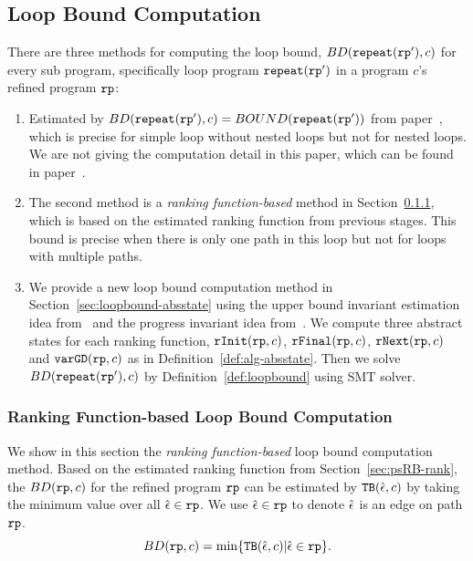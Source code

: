 
\subsection{Loop Bound Computation}
There are three methods for computing the loop bound, $BD(\mathtt{repeat}(\mathtt{rp}'), c)$ for every sub program, specifically loop program $\mathtt{repeat}(\mathtt{rp}')$ in a program $c$'s refined program $\mathtt{rp}$:
\begin{enumerate}
  \item Estimated by $BD(\mathtt{repeat}(\mathtt{rp}'), c) = BOUND(\mathtt{repeat}(\mathtt{rp}'))$ from paper~\cite{GulwaniJK09}, which is precise for simple loop without nested loops but not for nested loops. We are not giving the computation detail in this paper, which can be found in paper~\cite{GulwaniJK09}.
  \item 
  The second method is a \emph{ranking function-based}  method in Section~\ref{sec:loopbound-rankbased}, which is
  based on the estimated ranking function from previous stages.
  This bound is precise when there is only one path in this loop but not for loops with multiple paths.
  \item We provide a new loop bound computation method in Section~\ref{sec:loopbound-absstate} using the upper bound invariant estimation idea from~\cite{SinnZV17} and the progress invariant idea from~\cite{GulwaniJK09}.
  We compute three abstract states for each ranking function, $\mathtt{rInit}(\mathtt{rp}, c)$, $\mathtt{rFinal}(\mathtt{rp}, c)$, $\mathtt{rNext}(\mathtt{rp}, c)$ and $\mathtt{varGD}(\mathtt{rp}, c)$ as in Definition~\ref{def:alg-absstate}.
  Then we solve $BD(\mathtt{repeat}(\mathtt{rp}'), c)$ by Definition~\ref{def:loopbound} using SMT solver.
\end{enumerate}
%
\subsubsection{Ranking Function-based Loop Bound Computation}
\label{sec:loopbound-rankbased}
We show in this section the \emph{ranking function-based} loop bound computation method.
Based on the estimated ranking function from Section~\ref{sec:psRB-rank}, the $BD(\mathtt{rp}, c)$ for the refined program $\mathtt{rp}$ can be estimated by ${\mathtt{TB}}(\hat{\mathtt{\epsilon}{}}, c)$ by taking the
minimum value over all $\hat{\mathtt{\epsilon}{}} \in \mathtt{rp}$.
We use $\hat{\mathtt{\epsilon}{}} \in \mathtt{rp}$ to denote $\hat{\mathtt{\epsilon}{}}$ is an edge on path $\mathtt{rp}$.
\begin{equation}
  \label{eq:absBD}
  BD(\rprog, c) = \min\left\{ \absclr(\absevent, c) \middle\vert \absevent \in \rprog \right\}.
\end{equation}
%
%

